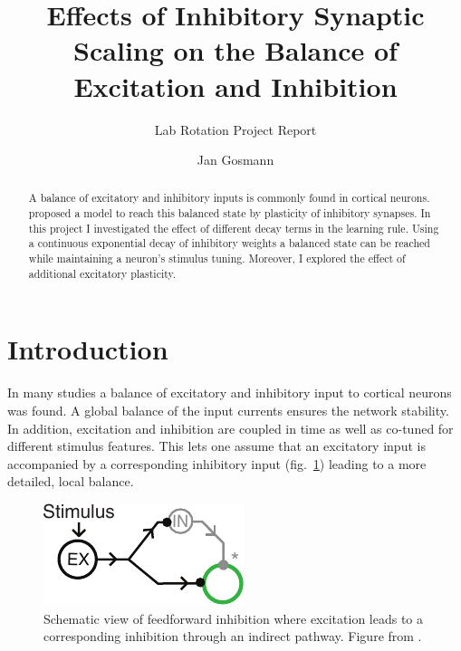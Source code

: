 \documentclass[11pt,a4paper]{scrartcl}
\title{Effects of Inhibitory Synaptic Scaling on the Balance of Excitation and 
    Inhibition}
\subtitle{Lab Rotation Project Report}
\author{Jan Gosmann}
\begin{document}
\maketitle

\begin{abstract}
    \footnotesize
    A balance of excitatory and inhibitory inputs is commonly found in cortical 
    neurons. \Textcite{Vogels:2011wr} proposed a model to reach this balanced 
    state by plasticity of inhibitory synapses. In this project I investigated 
    the effect of different decay terms in the learning rule. Using a continuous 
    exponential decay of inhibitory weights a balanced state can be reached 
    while maintaining a neuron's stimulus tuning. Moreover, I explored the 
    effect of additional excitatory plasticity.
\end{abstract}

\section{Introduction}
In many studies \parencite[e.g.][]{Okun:2008db, Froemke:2007fo, Wehr:2003hq, 
    delaRocha:ua} a balance of excitatory and inhibitory input to cortical 
neurons was found. A global balance of the input currents ensures the network 
stability. In addition, excitation and inhibition are coupled in time as well as
co-tuned for different stimulus features. This lets one assume that an 
excitatory input is accompanied by a corresponding inhibitory input 
(fig.~\ref{fig:ff_inhibition}) leading to a more detailed, local balance.

\begin{figure}
    \centering
    \includegraphics{figures/ff_inhibition}
    \caption{Schematic view of feedforward inhibition where excitation leads to 
        a corresponding inhibition through an indirect pathway. Figure from 
        \textcite{Vogels:2011wr}.}
    \label{fig:ff_inhibition}
\end{figure}
\end{document}
